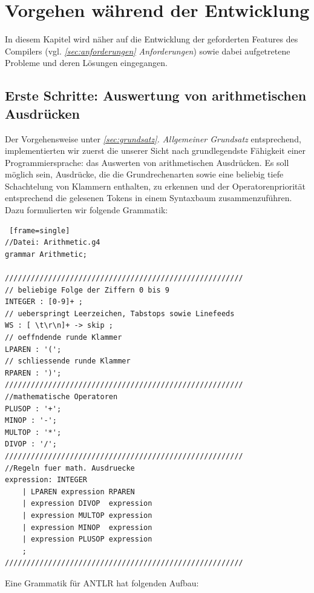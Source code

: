 
\section{Vorgehen während der Entwicklung}
In diesem Kapitel wird näher auf die Entwicklung der geforderten Features des Compilers (vgl. \textit{\ref{sec:anforderungen} Anforderungen}) sowie dabei aufgetretene Probleme und deren Lösungen eingegangen.

\subsection{Erste Schritte: Auswertung von arithmetischen Ausdrücken}
\label{subsec:arithExp}
Der Vorgehensweise unter \textit{\ref{sec:grundsatz}. Allgemeiner Grundsatz} entsprechend, implementierten wir zuerst die unserer Sicht nach grundlegendste Fähigkeit einer Programmiersprache: das Auswerten von arithmetischen Ausdrücken. Es soll möglich sein, Ausdrücke, die die Grundrechenarten sowie eine beliebig tiefe Schachtelung von Klammern enthalten, zu erkennen und der Operatorenpriorität entsprechend die gelesenen Tokens in einem Syntaxbaum zusammenzuführen. Dazu formulierten wir folgende Grammatik:


\scriptsize\begin{lstlisting} [frame=single] 
//Datei: Arithmetic.g4
grammar Arithmetic;

///////////////////////////////////////////////////////
// beliebige Folge der Ziffern 0 bis 9
INTEGER : [0-9]+ ;        
// ueberspringt Leerzeichen, Tabstops sowie Linefeeds
WS : [ \t\r\n]+ -> skip ; 
// oeffndende runde Klammer
LPAREN : '(';		  	  
// schliessende runde Klammer
RPAREN : ')';		  	  
///////////////////////////////////////////////////////
//mathematische Operatoren
PLUSOP : '+';
MINOP : '-';
MULTOP : '*';
DIVOP : '/';
///////////////////////////////////////////////////////
//Regeln fuer math. Ausdruecke
expression: INTEGER					
	| LPAREN expression RPAREN		
	| expression DIVOP  expression  
	| expression MULTOP expression	
	| expression MINOP  expression 
	| expression PLUSOP expression 
	;			
///////////////////////////////////////////////////////

\end{lstlisting}
\normalsize
Eine Grammatik für ANTLR hat folgenden Aufbau:

